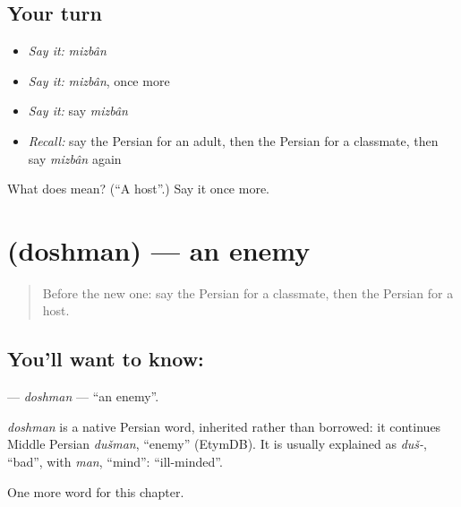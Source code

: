 \subsection*{Your turn}
\begin{itemize}
\raggedright
  \item \emph{Say it:} \emph{mizbân}
  \item \emph{Say it:} \emph{mizbân}, once more
  \item \emph{Say it:} say \emph{mizbân}
  \item \emph{Recall:} say the Persian for an adult, then the Persian for a classmate, then say \emph{mizbân} again
\end{itemize}

\begin{tcolorbox}[breakable,colback=teal!4,colframe=teal!35!black,title={Before you move on}]
What does  mean? (\textquotedblleft{}A host\textquotedblright{}.) Say it once more.
\end{tcolorbox}
\section[\texorpdfstring{\fa{دشمن} (doshman)}{دشمن (doshman)}]{ (doshman) — an enemy}

\label{lesson:FA-C169-doshman}



\begin{quote}
Before the new one: say the Persian for a classmate, then the Persian for a host.
\end{quote}

\subsection*{You'll want to know: }
\textbf{} — \emph{doshman} — \textquotedblleft{}an enemy\textquotedblright{}.

\begin{cousinweb}
\emph{doshman} is a native Persian word, inherited rather than borrowed: it continues Middle Persian \emph{dušman}, \textquotedblleft{}enemy\textquotedblright{} (EtymDB). It is usually explained as \emph{duš-}, \textquotedblleft{}bad\textquotedblright{}, with \emph{man}, \textquotedblleft{}mind\textquotedblright{}: \textquotedblleft{}ill-minded\textquotedblright{}.
\end{cousinweb}

\begin{grammarlens}[title={What you've built}]
One more word for this chapter.
\end{grammarlens}

